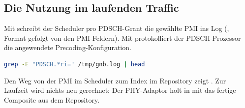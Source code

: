 \subsection{Die Nutzung im laufenden Traffic}

Mit  schreibt der Scheduler pro PDSCH-Grant die gewählte PMI ins Log
(, Format  gefolgt von den
PMI-Feldern). Mit  protokolliert der PDSCH-Prozessor die angewendete
Precoding-Konfiguration.

\begin{lstlisting}[language=bash]
grep -E "PDSCH.*ri=" /tmp/gnb.log | head
\end{lstlisting}

Den Weg von der PMI im Scheduler zum Index im Repository zeigt .
Zur Laufzeit wird nichts neu gerechnet: Der PHY-Adaptor holt in
 mit  das fertige
Composite aus dem Repository.
